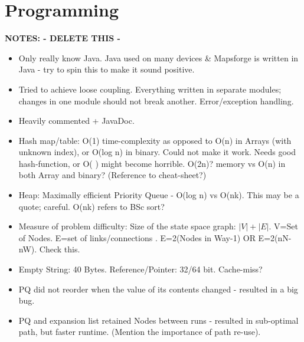 \section{Programming}
\textbf{NOTES: - DELETE THIS -}
\begin{itemize}
	\item Only really know Java. Java used on many devices \& Mapsforge is written in Java - try to spin this to make it sound positive.
	\item Tried to achieve loose coupling. Everything written in separate modules; changes in one module should not break another. Error/exception handling.
	\item Heavily commented + JavaDoc.
	\item Hash map/table: O(1) time-complexity as opposed to O(n) in Arrays (with unknown index), or O(log n) in binary. Could not make it work. Needs good hash-function, or O( ) might become horrible. O(2n)? memory vs O(n) in both Array and binary? (Reference to cheat-sheet?)
	\item Heap: Maximally efficient Priority Queue - O(log n) vs O(nk). This may be a quote; careful. O(nk) refers to BSc sort?
	\item Measure of problem difficulty: Size of the state space graph: $|V|+|E|$. V=Set of Nodes. E=set of links/connections \cite[Page: ?]{RN27}. E=2(Nodes in Way-1) OR E=2(nN-nW). Check this.
	\item Empty String: 40 Bytes. Reference/Pointer: 32/64 bit. Cache-miss?
	\item PQ did not reorder when the value of its contents changed - resulted in a big bug.
	\item PQ and expansion list retained Nodes between runs - resulted in sub-optimal path, but faster runtime. (Mention the importance of path re-use).
\end{itemize}





 
